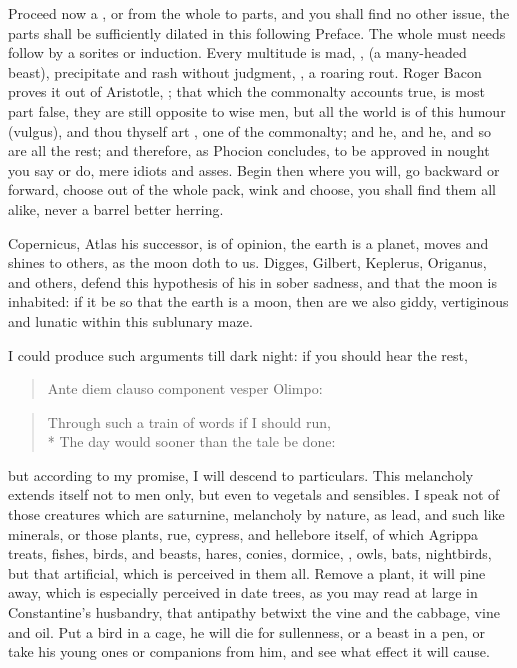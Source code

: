 {Proceed now a , or from the whole to parts, and you
shall find no other issue, the parts shall be sufficiently dilated in
this following Preface. The whole must needs follow by a sorites or
induction. Every multitude is mad, , (a
many-headed beast), precipitate and rash without judgment, , a roaring rout. Roger Bacon proves it out of Aristotle,
; that which the commonalty accounts true, is most part
false, they are still opposite to wise men, but all the world is of
this humour (vulgus), and thou thyself art , one of the
commonalty; and he, and he, and so are all the rest; and therefore, as
Phocion concludes, to be approved in nought you say or do, mere idiots
and asses. Begin then where you will, go backward or forward, choose
out of the whole pack, wink and choose, you shall find them all alike,
never a barrel better herring.

Copernicus, Atlas his successor, is of opinion, the earth is a planet,
moves and shines to others, as the moon doth to us. Digges, Gilbert,
Keplerus, Origanus, and others, defend this hypothesis of his in sober
sadness, and that the moon is inhabited: if it be so that the earth is
a moon, then are we also giddy, vertiginous and lunatic within this
sublunary maze.

I could produce such arguments till dark night: if you should hear the
rest,

\begin{verse}
\textlatin{Ante diem clauso component vesper Olimpo:}
\end{verse}

\begin{verse}
Through such a train of words if I should run,\\*
The day would sooner than the tale be done:
\end{verse}

but according to my promise, I will descend to particulars. This
melancholy extends itself not to men only, but even to vegetals and
sensibles. I speak not of those creatures which are saturnine,
melancholy by nature, as lead, and such like minerals, or those plants,
rue, cypress, \etc{} and hellebore itself, of which Agrippa treats,
fishes, birds, and beasts, hares, conies, dormice, \etc{}, owls, bats,
nightbirds, but that artificial, which is perceived in them all. Remove
a plant, it will pine away, which is especially perceived in date
trees, as you may read at large in Constantine's husbandry, that
antipathy betwixt the vine and the cabbage, vine and oil. Put a bird in
a cage, he will die for sullenness, or a beast in a pen, or take his
young ones or companions from him, and see what effect it will cause.

}
